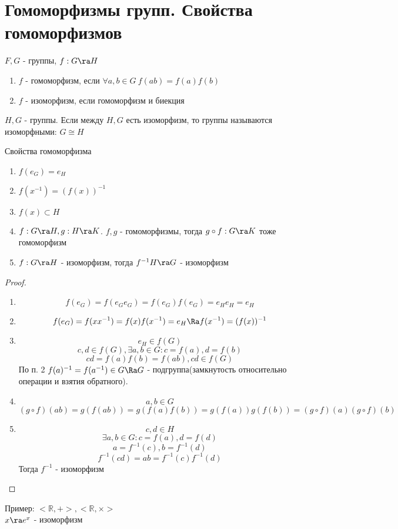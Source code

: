 \section{Гомоморфизмы групп. Свойства гомоморфизмов}
\begin{Def}
	$F, G$ - группы, $f: G \ra H$
	\begin{enumerate}
		\item $f$ - гомоморфизм, если $\forall a, b \in G \: f(ab) = f(a)f(b)$
		\item $f$ - изоморфизм, если гомоморфизм и биекция
	\end{enumerate}
\end{Def}

\begin{Def}
	$H, G$ - группы. Если между $H, G$ есть изоморфизм, то группы называются изоморфными: $G \cong H$      \\
\end{Def}						

\begin{theorem}{Свойства гомоморфизма}
	\begin{enumerate}
		\item $f(e_G) = e_H$
		\item $f(x^{-1}) = (f(x))^{-1}$
		\item $f(x) \subset H$
		\item $f: G \ra H, g: H \ra K$. $f, g$ - гомоморфизмы, тогда $g \circ f: G \ra K$ тоже гомоморфизм
		\item $f: G \ra H$ - изоморфизм, тогда $f^{-1} H \ra G$ - изоморфизм
	\end{enumerate}
\end{theorem}
\begin{proof}
	\begin{enumerate}
		\item $$f(e_G) = f(e_G e_G) = f(e_G)f(e_G) = e_H e_H = e_H$$
		\item $$f(e_G) = f(x x^{-1}) = f(x)f(x^{-1}) = e_H \Ra f(x^{-1}) = (f(x))^{-1}$$
		\item 
			$$e_H \in f(G)$$
			$$c, d \in f(G), \exists a, b \in G: c = f(a), d = f(b)$$
			$$cd = f(a)f(b) = f(ab), cd \in f(G)$$ 
			По п. 2 $f(a)^{-1} = f(a^{-1}) \in G \Ra G$ - подгруппа(замкнутость относительно операции и взятия обратного).
		\item
			$$a, b \in G$$
			$$(g \circ f)(ab) = g(f(ab)) = g(f(a)f(b)) = g(f(a))g(f(b)) = (g \circ f)(a)(g \circ f)(b)$$
		\item
			$$c, d \in H$$
			$$\exists a, b \in G: c = f(a), d = f(d)$$
			$$a = f^{-1}(c), b = f^{-1}(d)$$
			$$f^{-1}(cd) = ab = f^{-1}(c)f^{-1}(d)$$
			Тогда $f^{-1}$ - изоморфизм			
	\end{enumerate}   
\end{proof}		

Пример: $< \mathbb{R}, +>, < \mathbb{R}, \times>$ \\
$x \ra e^x$ - изоморфизм

